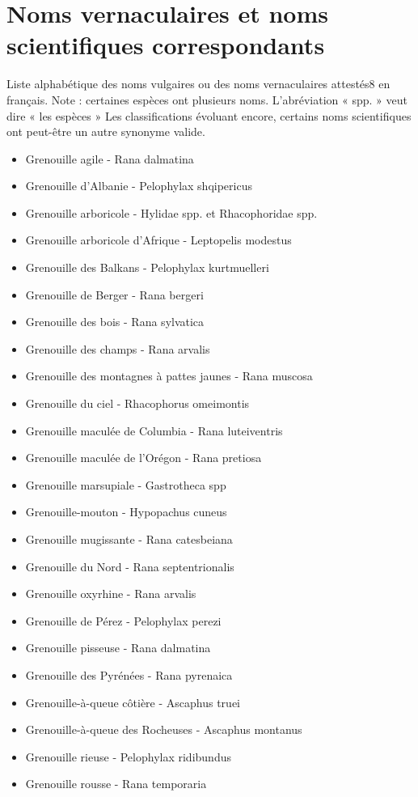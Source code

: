 
\section{Noms vernaculaires et noms scientifiques correspondants}
 
 Liste alphabétique des noms vulgaires ou des noms vernaculaires attestés8 en français.
Note : certaines espèces ont plusieurs noms. L'abréviation « spp. » veut dire « les espèces »
Les classifications évoluant encore, certains noms scientifiques ont peut-être un autre synonyme valide.

\begin{multicols}{2}
    \begin{itemize}
  
\item Grenouille agile - Rana dalmatina 
\item Grenouille d'Albanie - Pelophylax shqipericus 
\item Grenouille arboricole - Hylidae spp. et Rhacophoridae spp.
\item Grenouille arboricole d'Afrique - Leptopelis modestus 
\item Grenouille des Balkans - Pelophylax kurtmuelleri 
\item Grenouille de Berger - Rana bergeri 
\item Grenouille des bois - Rana sylvatica 
\item Grenouille des champs - Rana arvalis 
\item Grenouille des montagnes à pattes jaunes - Rana muscosa
\item Grenouille du ciel - Rhacophorus omeimontis 
\item Grenouille maculée de Columbia - Rana luteiventris 
\item Grenouille maculée de l'Orégon - Rana pretiosa 
\item Grenouille marsupiale - Gastrotheca spp 
\item Grenouille-mouton - Hypopachus cuneus 
\item Grenouille mugissante - Rana catesbeiana
\item Grenouille du Nord - Rana septentrionalis 
\item Grenouille oxyrhine - Rana arvalis
\item Grenouille de Pérez - Pelophylax perezi 
\item Grenouille pisseuse - Rana dalmatina
\item Grenouille des Pyrénées - Rana pyrenaica 
\item Grenouille-à-queue côtière - Ascaphus truei 
\item Grenouille-à-queue des Rocheuses - Ascaphus montanus 
\item Grenouille rieuse - Pelophylax ridibundus 
\item Grenouille rousse - Rana temporaria 
\end{itemize}
\end{multicols}    


